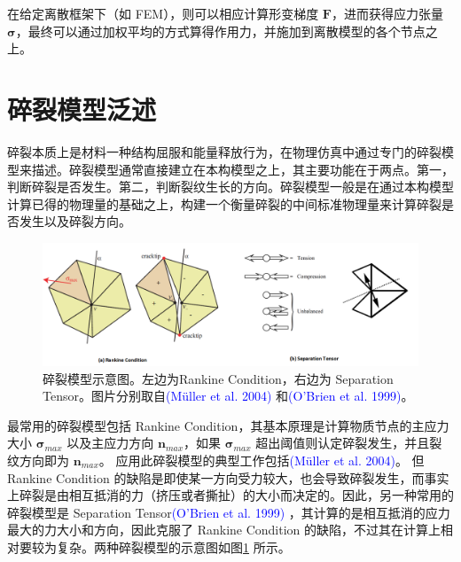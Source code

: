 在给定离散框架下（如 FEM），则可以相应计算形变梯度 $\textbf{F}$，进而获得应力张量 $\mathbf{\sigma}$，最终可以通过加权平均的方式算得作用力，并施加到离散模型的各个节点之上。

\section{碎裂模型泛述}
\label{fracture_model_section}

碎裂本质上是材料一种结构屈服和能量释放行为，在物理仿真中通过专门的碎裂模型来描述。碎裂模型通常直接建立在本构模型之上，其主要功能在于两点。第一，判断碎裂是否发生。第二，判断裂纹生长的方向。碎裂模型一般是在通过本构模型计算已得的物理量的基础之上，构建一个衡量碎裂的中间标准物理量来计算碎裂是否发生以及碎裂方向。

\begin{figure}[!htb]
  \centering
  \captionsetup{justification=centering}
  \includegraphics[width=\linewidth]{chap/image/fracture_model}

  \caption{\label{fracture_model}
           碎裂模型示意图。左边为Rankine Condition，右边为 Separation Tensor。图片分别取自\textcolor{blue}{(M\"{u}ller et al. 2004)\supercite{Muller2004}} 和\textcolor{blue}{(O'Brien et al. 1999)\supercite{OBrien1999}}。
          }
\end{figure}

最常用的碎裂模型包括 Rankine Condition，其基本原理是计算物质节点的主应力大小 $\mathbf{\sigma}_{max}$ 以及主应力方向 $\textbf{n}_{max}$，如果 $\mathbf{\sigma}_{max}$ 超出阈值则认定碎裂发生，并且裂纹方向即为 $\textbf{n}_{max}$。 应用此碎裂模型的典型工作包括\textcolor{blue}{(M\"{u}ller et al. 2004)\supercite{Muller2004}}。 但 Rankine Condition 的缺陷是即使某一方向受力较大，也会导致碎裂发生，而事实上碎裂是由相互抵消的力（挤压或者撕扯）的大小而决定的。因此，另一种常用的碎裂模型是 Separation Tensor\textcolor{blue}{(O'Brien et al. 1999)\supercite{OBrien1999}} ，其计算的是相互抵消的应力最大的力大小和方向，因此克服了 Rankine Condition 的缺陷，不过其在计算上相对要较为复杂。两种碎裂模型的示意图如图\ref{fracture_model} 所示。

